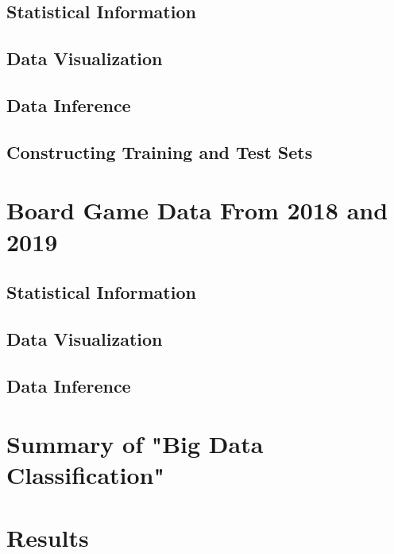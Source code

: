 \documentclass[a4paper,12pt]{IEEEtran}
\begin{document}
\subsection{Statistical Information}

\label{sec1}

\subsection{Data Visualization}
\label{sec2}

\subsection{Data Inference}
\label{sec3}

\subsection{Constructing Training and Test Sets}
\label{sec4}

\section{Board Game Data From 2018 and 2019}

\subsection{Statistical Information}
\label{sec5}

\subsection{Data Visualization}
\label{sec6}

\subsection{Data Inference}
\label{sec7}

\section{Summary of "Big Data Classification"}

\section{Results}
\end{document}
